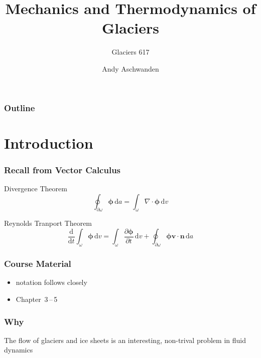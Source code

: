 \documentclass[hide notes,intlimits]{beamer}
\title[Glacier Dynamics] %
{Mechanics and Thermodynamics of Glaciers}
\subtitle{Glaciers 617}
\author[Aschwanden] %
{Andy Aschwanden}
\institute[ARSC] %
{
  Arctic Region Supercomputing Center\\
  University of Alaska Fairbanks, USA
}
\begin{document}
\begin{frame}
  \titlepage
\end{frame}

\begin{frame}
 \frametitle{Outline}
 \tableofcontents[subsectionstyle=hide]
\end{frame}

\section{Introduction}


\begin{frame}
  \frametitle{Recall from Vector Calculus}
  \begin{block}{Divergence Theorem}
    \begin{equation}
      \oint_{\partial \omega} \boldsymbol{\phi} \,\text{d}a = 
      \int_{\omega} \nabla \cdot \boldsymbol{\phi} \, \text{d} v
    \end{equation}
  \end{block}
  \begin{block}{Reynolds Tranport Theorem}
    \begin{equation}
     \frac{\text{d}}{\text{d} t}\int_{\omega} \boldsymbol{\phi}\, \text{d} v =
     \int_{\omega} \frac{\partial \boldsymbol{\phi}}{\partial{t}} \, \text{d} v +
      \oint_{\partial \omega} \boldsymbol{\phi} \mathbf{v}\cdot\mathbf{n}\,\text{d}a 
    \end{equation}
  \end{block}
\end{frame}


\begin{frame}
  \frametitle{Course Material}
  \begin{itemize}
    \item notation follows closely \cite{GreveBlatter_disg}
    \item Chapter~3\,--\,5
  \end{itemize}
  \def\newblock{}
  
\end{frame}


\begin{frame}
  \frametitle{Why}
  The flow of glaciers and ice sheets is an interesting, non-trival problem in fluid dynamics
\end{frame}

\end{document}
